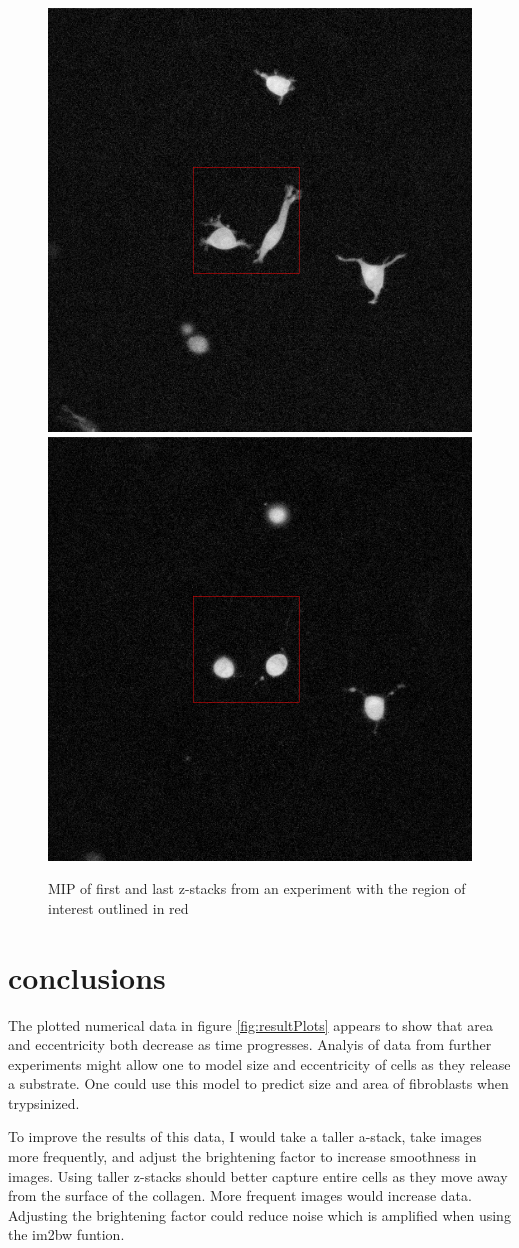\documentclass[ twocolumn,notitlepage]{ revtex4-1}
\begin{document}
\begin{figure}[h!]
\includegraphics[width=.2\textwidth]{img/0-first-full.png}
\includegraphics[width=.2\textwidth]{img/0-last-full.png}
\caption{\label{fig:0-full}MIP of first and last z-stacks from an experiment with the region of interest outlined in red}
\end{figure}

\section*{conclusions}
The plotted numerical data in figure \ref{fig:resultPlots} appears to show that area and eccentricity both decrease as time progresses. Analyis of data from further experiments might allow one to model size and eccentricity of cells as they release a substrate. One could use this model to predict size and area of fibroblasts when trypsinized.

To improve the results of this data, I would take a taller a-stack, take images more frequently, and adjust the brightening factor to increase smoothness in images. Using taller z-stacks should better capture entire cells as they move away from the surface of the collagen. More frequent images would increase data. Adjusting the brightening factor could reduce noise which is amplified when using the im2bw funtion.

%
\end{document}
